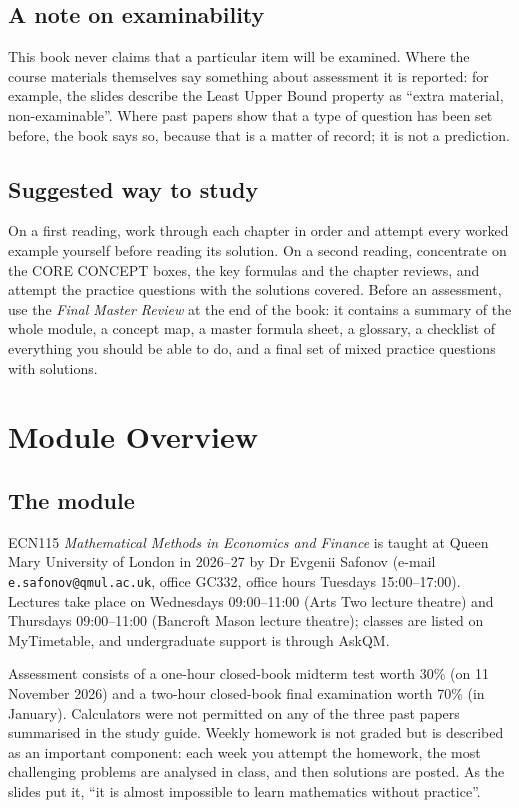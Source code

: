 \section*{A note on examinability}
This book never claims that a particular item will be examined. Where the course materials themselves
say something about assessment it is reported: for example, the slides describe the Least Upper Bound
property as ``extra material, non-examinable''. Where past papers show that a type of question has been
set before, the book says so, because that is a matter of record; it is not a prediction.

\section*{Suggested way to study}
On a first reading, work through each chapter in order and attempt every worked example yourself before
reading its solution. On a second reading, concentrate on the CORE CONCEPT boxes, the key formulas and
the chapter reviews, and attempt the practice questions with the solutions covered. Before an assessment,
use the \emph{Final Master Review} at the end of the book: it contains a summary of the whole module, a
concept map, a master formula sheet, a glossary, a checklist of everything you should be able to do, and
a final set of mixed practice questions with solutions.

\chapter{Module Overview}

\section*{The module}
ECN115 \emph{Mathematical Methods in Economics and Finance} is taught at Queen Mary University of London in
2026--27 by Dr Evgenii Safonov (e-mail \texttt{e.safonov@qmul.ac.uk}, office GC332, office hours Tuesdays
15:00--17:00). Lectures take place on Wednesdays 09:00--11:00 (Arts Two lecture theatre) and Thursdays
09:00--11:00 (Bancroft Mason lecture theatre); classes are listed on MyTimetable, and undergraduate support
is through AskQM. 

Assessment consists of a one-hour closed-book midterm test worth 30\% (on 11 November 2026) and a two-hour
closed-book final examination worth 70\% (in January). Calculators were not permitted on any of the three
past papers summarised in the study guide. Weekly homework is not graded but is described as an important
component: each week you attempt the homework, the most challenging problems are analysed in class, and
then solutions are posted. As the slides put it, ``it is almost impossible to learn mathematics without
practice''.

